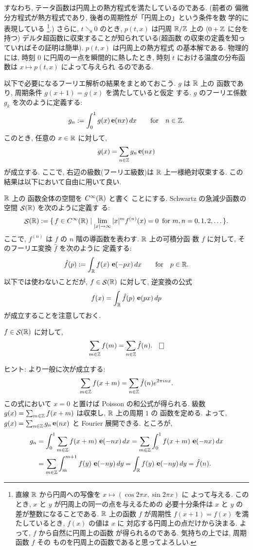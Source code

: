 \documentclass[12pt,twoside]{jarticle}
\begin{document}
\noindent %
すなわち, テータ函数は円周上の熱方程式を満たしているのである. (前者の
偏微分方程式が熱方程式であり, 後者の周期性が「円周上の」という条件を数
学的に表現している
%
\footnote{%
  直線 ${\mathbb R}$ から円周への写像を $x\mapsto(\cos 2\pi x, \sin 2\pi x)$ に
  よって与える. このとき, $x$ と $y$ が円周上の同一の点を与えるための
  必要十分条件は $x$ と $y$ の差が整数になることである. ${\mathbb R}$ 上の函数 
  $f$ が周期性 $f(x+1)=f(x)$ を満たしているとき, $f(x)$ の値は $x$ に
  対応する円周上の点だけから決まる. よって, $f$ から自然に円周上の函数
  が得られるのである. 気持ちの上では, 周期函数 $f$ その
  ものを円周上の函数であると思ってよろしい. }.) 
%
さらに, $t\searrow 0$ のとき, $p(t,x)$ は円周 ${\mathbb R}/{\mathbb Z}$ 上の %
($0 + {\mathbb Z}$ に台を持つ) デルタ超函数に収束することが知られている(超函数
の収束の定義を知っていればその証明は簡単). $p(t,x)$ は円周上の熱方程式
の基本解である. 物理的には, 時刻 $0$ に円周の一点を瞬間的に熱したとき, 
時刻 $t$ における温度の分布函数は $x \mapsto p(t,x)$ によって与えられ
るのである. 

以下で必要になるフーリエ解析の結果をまとめておこう. $g$ は ${\mathbb R}$ 上の
\Class{\infty}函数であり, 周期条件 $g(x+1)=g(x)$ を満たしていると仮定
する. $g$ のフーリエ係数 $g_k$ を次のように定義する:
\[
  g_n := \int_0^1 g(x) \mathop{\mathbf{e}}\nolimits(nx) \,dx
  \qquad\text{for}\quad n \in {\mathbb Z}.
\]
このとき, 任意の $x\in{\mathbb R}$ に対して,
\[
  g(x) = \sum_{n\in{\mathbb Z}} g_n \mathop{\mathbf{e}}\nolimits(nx)
\]%
が成立する. ここで, 右辺の級数(フーリエ級数)は ${\mathbb R}$ 上一様絶対収束する.
この結果は以下において自由に用いて良い.

${\mathbb R}$ 上の \Class{\infty} 函数全体の空間を $\text{$C^{\infty}$}({\mathbb R})$ と書く
ことにする. Schwartz の急減少函数の空間 $\mathop{\mathcal{S}}\nolimits({\mathbb R})$ を次のように定義す
る:
\[
  \mathop{\mathcal{S}}\nolimits({\mathbb R})
  :=
  \{\, f \in \text{$C^{\infty}$}({\mathbb R}) \mid
       \lim_{|x|\to\infty} |x|^m f^{(n)}(x) = 0
       \enspace \text{for}\  m,n = 0,1,2,\dots \,\}.
\]%
ここで, $f^{(n)}$ は $f$ の $n$ 階の導函数を表わす. ${\mathbb R}$ 上の可積分函
数 $f$ に対して, そのフーリエ変換 $\hat f$ を次のように
定義する:
\[
  \hat f(p) := \int_{\mathbb R} f(x)\,\mathop{\mathbf{e}}\nolimits(-px)\,dx
  \qquad\text{for}\quad p \in {\mathbb R}.
\]%
以下では使わないことだが, $f \in \mathop{\mathcal{S}}\nolimits({\mathbb R})$ に対して, 逆変換の公式
\[
  f(x) = \int_{\mathbb R} \hat f(p)\,\mathop{\mathbf{e}}\nolimits(px)\,dp
\]
が成立することを注意しておく.

\begin{question}\qstar{*}
  $f \in \mathop{\mathcal{S}}\nolimits({\mathbb R})$ に対して, 
  \[
    \sum_{m\in\Z} f(m) = \sum_{n\in\Z} \hat f(n).
  \qed
  \]
\end{question}

\noindent ヒント: より一般に次が成立する:
\[
  \sum_{m\in{\mathbb Z}} f(x+m) = \sum_{n\in{\mathbb Z}} \hat f(n) e^{2\pi inx}.
\]%
この式において $x=0$ と置けば Poisson の和公式が得られる. %
級数 $g(x) = \sum_{m\in{\mathbb Z}} f(x+m)$ は収束し, ${\mathbb R}$ 上の周期 $1$ の %
\Class{\infty} 函数を定める. よって, 
\(
  g(x) = \sum_{n\in{\mathbb Z}} g_n \mathop{\mathbf{e}}\nolimits(nx)
\)%
と Fourier 展開できる. ところが, 
\begin{align*}
  g_n & = \int_0^1 \sum_{m\in{\mathbb Z}} f(x+m) \, \mathop{\mathbf{e}}\nolimits(-nx) \,dx 
        = \sum_{m\in{\mathbb Z}} \int_0^1 f(x+m) \, \mathop{\mathbf{e}}\nolimits(-nx) \,dx \\
      & = \sum_{m\in{\mathbb Z}} \int_{m}^{m+1} f(y) \, \mathop{\mathbf{e}}\nolimits(-ny) \,dy
        = \int_{\mathbb R} f(y) \, \mathop{\mathbf{e}}\nolimits(-ny) \,dy = \hat f(n).
\end{align*}
\end{document}
